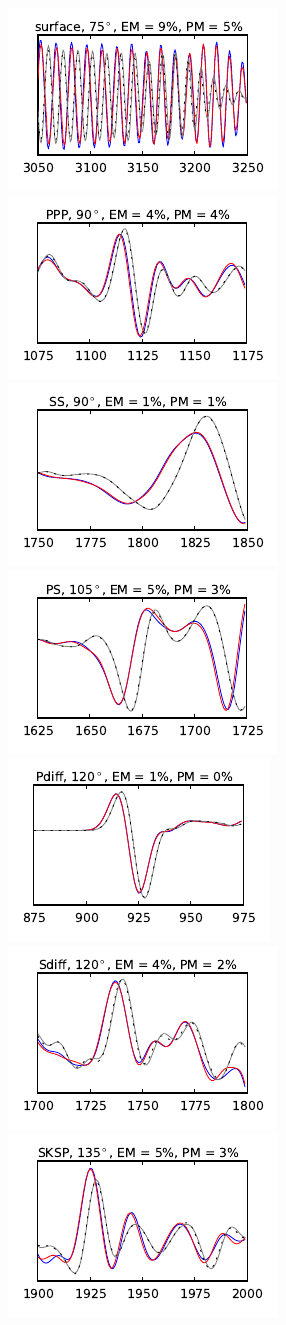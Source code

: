 \documentclass[extra]{gji}
\begin{document}
\begin{figure}
  \includegraphics[width=.25\textwidth]{fig/section/6.pdf}\hspace{-5pt}
  \includegraphics[width=.25\textwidth]{fig/section/7.pdf}\hspace{-5pt}
  \includegraphics[width=.25\textwidth]{fig/section/8.pdf}\vspace{-5pt}
  \includegraphics[width=.25\textwidth]{fig/section/9.pdf}\hspace{-5pt}
  \includegraphics[width=.25\textwidth]{fig/section/10.pdf}\hspace{-5pt}
  \includegraphics[width=.25\textwidth]{fig/section/11.pdf}\hspace{-5pt}
  \includegraphics[width=.25\textwidth]{fig/section/12.pdf}\vspace{-5pt}

\end{figure}
\end{document}
